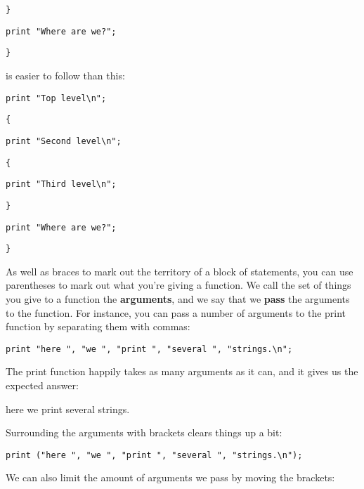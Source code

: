 \documentclass[a4paper,12pt,twoside]{book}
\begin{document}
\noindent \texttt{\}}

\noindent \texttt{print "Where are we?";}

\noindent \texttt{\}}

\noindent 

\noindent is easier to follow than this:

\noindent 

\noindent \texttt{print "Top level\textbackslash n";}

\noindent \texttt{\{}

\noindent \texttt{print "Second level\textbackslash n";}

\noindent \texttt{\{}

\noindent \texttt{print "Third level\textbackslash n";}

\noindent \texttt{\}}

\noindent \texttt{print "Where are we?";}

\noindent \texttt{\}}

\noindent 

\noindent As well as braces to mark out the territory of a block of statements, you can use parentheses to mark out what you're giving a function. We call the set of things you give to a function the \textbf{arguments}, and we say that we \textbf{pass }the arguments to the function. For instance, you can pass a number of arguments to the print function by separating them with commas:

\noindent 

\noindent \texttt{print "here ", "we ", "print ", "several ", "strings.\textbackslash n";}

\noindent 

\noindent The print function happily takes as many arguments as it can, and it gives us the expected answer:

\noindent 

\noindent here we print several strings.

\noindent 

\noindent Surrounding the arguments with brackets clears things up a bit:

\noindent 

\noindent \texttt{print ("here ", "we ", "print ", "several ", "strings.\textbackslash n");}

\noindent 

\noindent We can also limit the amount of arguments we pass by moving the brackets:

\noindent 
\end{document}
